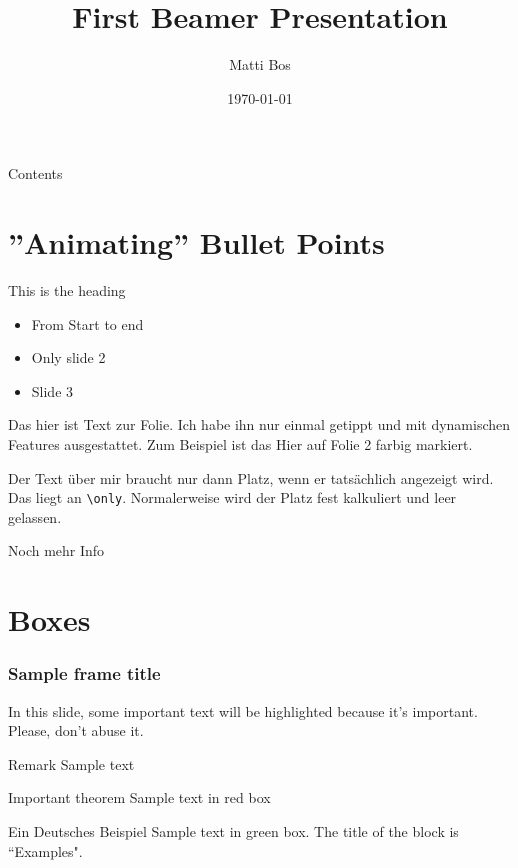 \documentclass[12pt, aspectratio=169]{beamer}
\title{First Beamer Presentation}
\author{Matti Bos}
\date{\today}
\begin{document}
\thispagestyle{empty} %
\maketitle

\begin{frame}{Contents}
\tableofcontents
\end{frame}

\section{''Animating'' Bullet Points}
\begin{frame}{This is the heading}

\begin{itemize}
    \item <1-> From Start to end
    \item <2> Only slide 2
    \item <3-> Slide 3
\end{itemize}

Das hier ist Text zur Folie. Ich habe ihn nur einmal getippt und mit dynamischen Features ausgestattet. Zum Beispiel ist \alert<2>{das Hier auf Folie 2} farbig markiert.
\end{frame}

\begin{frame}[fragile]

\vspace{1em}

Der Text über mir braucht nur dann Platz, wenn er tatsächlich angezeigt wird. Das liegt an \verb|\only|. Normalerweise wird der Platz fest kalkuliert und leer gelassen.

\pause
Noch mehr Info

\end{frame}

\section{Boxes}
\begin{frame}
\frametitle{Sample frame title}

In this slide, some important text will be
\alert{highlighted} because it's important.
Please, don't abuse it.

\begin{block}{Remark}
Sample text
\end{block}

\begin{alertblock}{Important theorem}
Sample text in red box
\end{alertblock}

\begin{exampleblock}{Ein Deutsches Beispiel}
Sample text in green box. The title of the block is ``Examples".
\end{exampleblock}
\end{frame}
\end{document}
